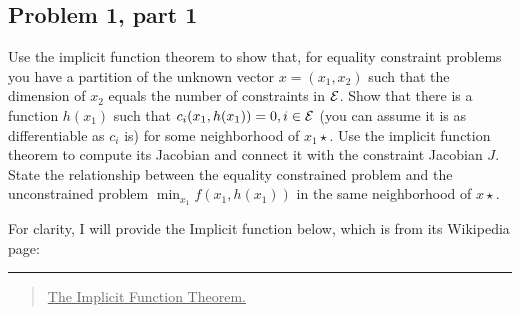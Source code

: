 \subsection{Problem 1, part 1}
Use the implicit function theorem to show that, for equality constraint problems you have a partition of the unknown vector $x = (x_1, x_2)$ such that the dimension of $x_2$ equals the number of constraints in $\mathcal{E}$. Show that there is a function $h(x_1)$ such that $c_i(x_1, h(x_1)) = 0, i \in \mathcal{E}$ (you can assume it is as differentiable as $c_i$ is) for some neighborhood of $x_1\star$. Use the implicit function theorem to compute its Jacobian and connect it with the constraint Jacobian $J$. State the relationship between the equality constrained problem and the unconstrained problem $\min_{x_1} f(x_1, h(x_1))$ in the same neighborhood of $x\star$.
\partbreak
\begin{solution}

    For clarity, I will provide the Implicit function below, which is from its Wikipedia page:
      \begin{center}\rule{17cm}{0.1mm}\end{center}
    \begin{quote}
    \vspace{-5mm}
        \underline{The Implicit Function Theorem.}


\end{quote}
\end{solution}
